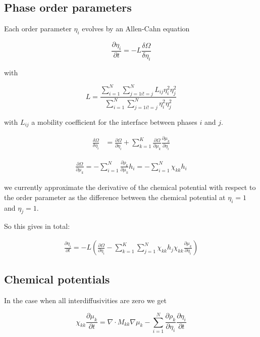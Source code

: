 \documentclass[11pt]{article}
\begin{document}
\subsection{Phase order parameters}
\label{sec:orgc4e45d8}

Each order parameter \(\eta_i\) evolves by an Allen-Cahn equation

$$
\frac{\partial \eta_i}{\partial t} = -L \frac{\delta \Omega}{\delta \eta_i}
$$

with

$$
L = \frac{ \sum_{i=1}^N \sum_{j=1 i!=j}^N L_{ij} \eta_i^2 \eta_j^2 }{ \sum_{i=1}^N
\sum_{j=1 i!=j}^N \eta_i^2 \eta_j^2 }
$$

with \(L_{ij}\) a mobility coefficient for the interface between phases \(i\) and \(j\).

\begin{align*}
\frac{\delta \Omega}{\delta \eta_i} &= \frac{\partial \Omega}{\partial \eta_i} + \sum_{k=1}^K \frac{\partial \Omega}{\partial \mu_k}\frac{\partial \mu_k}{\partial \eta_i}
\end{align*}

\begin{align*}
\frac{\partial \Omega}{\partial \mu_k} = -\sum_{i=1}^N \frac{\partial \rho_k}{\partial \mu_k} h_i = -\sum_{i=1}^N \chi_{kk} h_i
\end{align*}

we currently approximate the derivative of the chemical potential with respect to the order parameter as the difference between the chemical potential at \(\eta_i = 1\) and \(\eta_j = 1\).

So this gives in total:

\begin{align*}
\frac{\partial \eta_i}{\partial t} = -L \left( \frac{\partial \Omega}{\partial \eta_i} - \sum_{k=1}^K \sum_{j=1}^N \chi_{kk} h_j \chi_{kk} \frac{\partial \mu_k}{\partial \eta_i} \right)
\end{align*}

\subsection{Chemical potentials}
\label{sec:orga068fbd}

In the case when all interdiffusivities are zero we get

$$
\chi_{kk} \frac{\partial \mu_k}{\partial t} = \nabla \cdot M_{kk} \nabla \mu_k - \sum_{i=1}^N \frac{\partial \rho_k}{\partial \eta_i} \frac{\partial \eta_i}{\partial t}
$$
\end{document}

